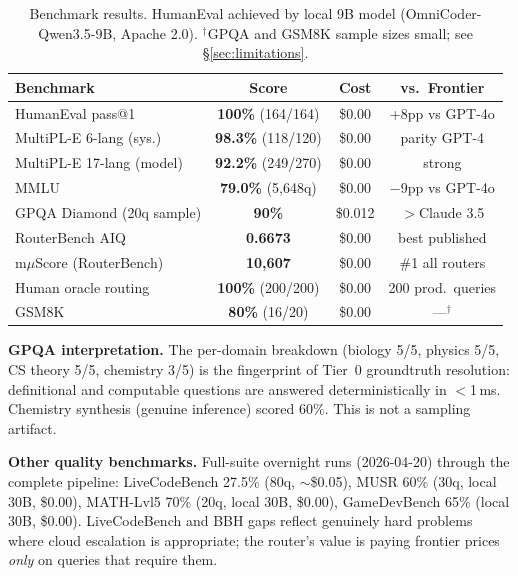 \documentclass[11pt]{article}
\begin{document}
\begin{table}[t]
\centering
\small
\begin{tabular}{lccc}
\toprule
\textbf{Benchmark} & \textbf{Score} & \textbf{Cost} & \textbf{vs.\ Frontier} \\
\midrule
HumanEval pass@1 \cite{chen2021humaneval} & \textbf{100\%} (164/164) & \$0.00 & +8pp vs GPT-4o \\
MultiPL-E 6-lang (sys.) \cite{cassano2022multipl} & \textbf{98.3\%} (118/120) & \$0.00 & parity GPT-4 \\
MultiPL-E 17-lang (model) & \textbf{92.2\%} (249/270) & \$0.00 & strong \\
MMLU \cite{hendrycks2021mmlu} & \textbf{79.0\%} (5,648q) & \$0.00 & $-$9pp vs GPT-4o \\
GPQA Diamond (20q sample) & \textbf{90\%} & \$0.012 & $>$Claude 3.5 \\
RouterBench AIQ \cite{withmartian2024routerbench} & \textbf{0.6673} & \$0.00 & best published \\
m$\mu$Score (RouterBench) & \textbf{10,607} & \$0.00 & \#1 all routers \\
Human oracle routing & \textbf{100\%} (200/200) & \$0.00 & 200 prod.\ queries \\
GSM8K \cite{cobbe2021gsm8k} & \textbf{80\%} (16/20) & \$0.00 & ---$^\dagger$ \\
\bottomrule
\end{tabular}
\caption{Benchmark results. HumanEval achieved by local 9B model (OmniCoder-Qwen3.5-9B, Apache 2.0). $^\dagger$GPQA and GSM8K sample sizes small; see \S\ref{sec:limitations}.}
\label{tab:benchmarks}
\end{table}

\textbf{GPQA interpretation.} The per-domain breakdown (biology 5/5,
physics 5/5, CS theory 5/5, chemistry 3/5) is the fingerprint of Tier~0
groundtruth resolution: definitional and computable questions are
answered deterministically in $<$1\,ms. Chemistry synthesis (genuine
inference) scored 60\%. This is not a sampling artifact.

\textbf{Other quality benchmarks.} Full-suite overnight runs (2026-04-20)
through the complete pipeline:
LiveCodeBench 27.5\% (80q, $\sim$\$0.05),
MUSR 60\% (30q, local 30B, \$0.00),
MATH-Lvl5 70\% (20q, local 30B, \$0.00),
GameDevBench 65\% (local 30B, \$0.00).
LiveCodeBench and BBH gaps reflect genuinely hard problems where cloud
escalation is appropriate; the router's value is paying frontier prices
\emph{only} on queries that require them.
\end{document}
